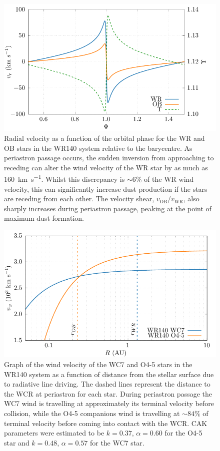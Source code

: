 \documentclass[fleqn,usenatbib]{mnras}
\newcommand{\rms}[1]{\ensuremath{_{\text{#1}}}}
\begin{document}
\begin{figure}
  \centering
  \includegraphics[width=\linewidth]{assets/radial-velocity/radial-shear.pdf}
  \caption[Radial velocity]{Radial velocity as a function of the orbital phase for the WR and OB stars in the WR140 system relative to the barycentre. As periastron passage occurs, the sudden inversion from approaching to receding can alter the wind velocity of the WR star by as much as \SI{160}{\kilo\metre\per\second}. Whilst this discrepancy is $\sim 6\%$ of the WR wind velocity, this can significantly increase dust production if the stars are receding from each other. The velocity shear, $v\rms{OB}/v\rms{WR}$, also sharply increases during periastron passage, peaking at the point of maximum dust formation.}
  \label{fig:p2-shear}
\end{figure}

\begin{figure}
  \centering
  \includegraphics[width=\linewidth]{assets/stag.pdf}
  \caption{Graph of the wind velocity of the WC7 and O4-5 stars in the WR140 system as a function of distance from the stellar surface due to radiative line driving. The dashed lines represent the distance to the WCR at periastron for each star. During periastron passage the WC7 wind is travelling at approximately its terminal velocity before collision, while the O4-5 companions wind is travelling at $\sim 84\%$ of terminal velocity before coming into contact with the WCR. CAK parameters were estimated to be $k = 0.37$, $\alpha = 0.60$ for the O4-5 star and $k=0.48$, $\alpha = 0.57$ for the WC7 star.}
  \label{fig:p2-cak}
\end{figure}
\end{document}
